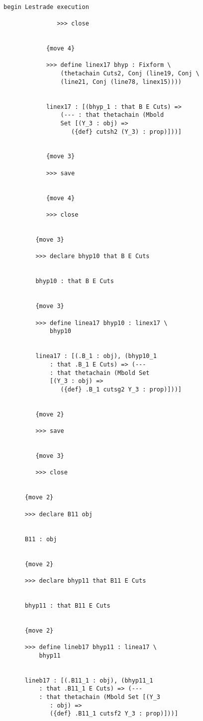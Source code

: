 \documentclass[12pt]{article}
\begin{document}
\begin{verbatim}

begin Lestrade execution

               >>> close


            {move 4}

            >>> define linex17 bhyp : Fixform \
                (thetachain Cuts2, Conj (line19, Conj \
                (line21, Conj (line78, linex15))))


            linex17 : [(bhyp_1 : that B E Cuts) => 
                (--- : that thetachain (Mbold 
                Set [(Y_3 : obj) => 
                   ({def} cutsh2 (Y_3) : prop)]))]


            {move 3}

            >>> save


            {move 4}

            >>> close


         {move 3}

         >>> declare bhyp10 that B E Cuts


         bhyp10 : that B E Cuts


         {move 3}

         >>> define linea17 bhyp10 : linex17 \
             bhyp10


         linea17 : [(.B_1 : obj), (bhyp10_1 
             : that .B_1 E Cuts) => (--- 
             : that thetachain (Mbold Set 
             [(Y_3 : obj) => 
                ({def} .B_1 cutsg2 Y_3 : prop)]))]


         {move 2}

         >>> save


         {move 3}

         >>> close


      {move 2}

      >>> declare B11 obj


      B11 : obj


      {move 2}

      >>> declare bhyp11 that B11 E Cuts


      bhyp11 : that B11 E Cuts


      {move 2}

      >>> define lineb17 bhyp11 : linea17 \
          bhyp11


      lineb17 : [(.B11_1 : obj), (bhyp11_1 
          : that .B11_1 E Cuts) => (--- 
          : that thetachain (Mbold Set [(Y_3 
             : obj) => 
             ({def} .B11_1 cutsf2 Y_3 : prop)]))]



\end{verbatim}
\end{document}
